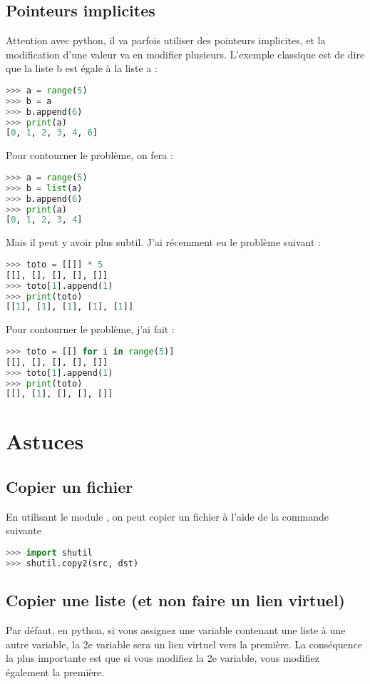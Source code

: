 \documentclass[a4paper,twoside]{article}
\begin{document}
\subsection{Pointeurs implicites}
Attention avec python, il va parfois utiliser des pointeurs implicites, et la modification d'une valeur va en modifier plusieurs. L'exemple classique est de dire que la liste b est égale à la liste a :
\begin{lstlisting}[language=python]
>>> a = range(5)
>>> b = a
>>> b.append(6)
>>> print(a)
[0, 1, 2, 3, 4, 6]
\end{lstlisting}

Pour contourner le problème, on fera :
\begin{lstlisting}[language=python]
>>> a = range(5)
>>> b = list(a)
>>> b.append(6)
>>> print(a)
[0, 1, 2, 3, 4]
\end{lstlisting}

\bigskip

Mais il peut y avoir plus subtil. J'ai récemment eu le problème suivant :
\begin{lstlisting}[language=python]
>>> toto = [[]] * 5
[[], [], [], [], []]
>>> toto[1].append(1)
>>> print(toto)
[[1], [1], [1], [1], [1]]
\end{lstlisting}

Pour contourner le problème, j'ai fait :
\begin{lstlisting}[language=python]
>>> toto = [[] for i in range(5)]
[[], [], [], [], []]
>>> toto[1].append(1)
>>> print(toto)
[[], [1], [], [], []]
\end{lstlisting}

\section{Astuces}
\subsection{Copier un fichier}
En utilisant le module , on peut copier un fichier à l'aide de la commande suivante 
\begin{lstlisting}[language=python]
>>> import shutil
>>> shutil.copy2(src, dst)
\end{lstlisting}

\subsection{Copier une liste (et non faire un lien virtuel)}
Par défaut, en python, si vous assignez une variable contenant une liste à une autre variable, la 2e variable sera un lien virtuel vers la première. La conséquence la plus importante est que si vous modifiez la 2e variable, vous modifiez également la première.
\end{document}
